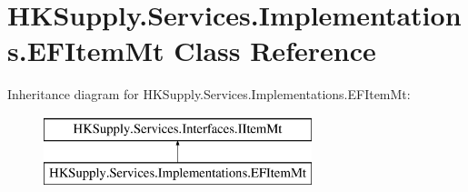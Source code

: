 \hypertarget{class_h_k_supply_1_1_services_1_1_implementations_1_1_e_f_item_mt}{}\section{H\+K\+Supply.\+Services.\+Implementations.\+E\+F\+Item\+Mt Class Reference}
\label{class_h_k_supply_1_1_services_1_1_implementations_1_1_e_f_item_mt}
Inheritance diagram for H\+K\+Supply.\+Services.\+Implementations.\+E\+F\+Item\+Mt\+:\begin{figure}[H]
\begin{center}
\leavevmode
\includegraphics[height=2.000000cm]{class_h_k_supply_1_1_services_1_1_implementations_1_1_e_f_item_mt}
\end{center}
\end{figure}

